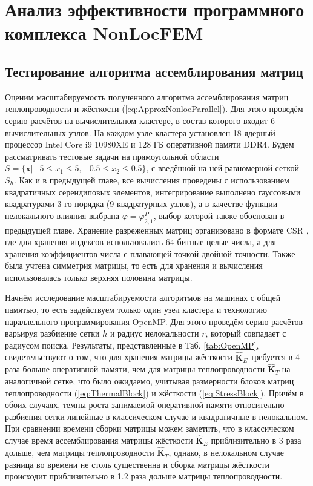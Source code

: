 \chapter{Анализ эффективности программного комплекса NonLocFEM}\label{ch:NonLocFEMAnalysis} 

\section{Тестирование алгоритма ассемблирования матриц}\label{sec:NumericalMethods/AssemblyTest}

Оценим масштабируемость полученного алгоритма ассемблирования матриц теплопроводности и жёсткости (\ref{eq:ApproxNonlocParallel}). Для этого проведём серию расчётов на вычислительном кластере, в состав которого входит 6 вычислительных узлов. На каждом узле кластера установлен 18-ядерный процессор Intel Core i9 10980XE и 128 ГБ оперативной памяти DDR4. Будем рассматривать тестовые задачи на прямоугольной области $S = \{ \boldsymbol{x} | -5 \leqslant x_1 \leqslant 5, -0.5 \leqslant x_2 \leqslant 0.5 \}$, с введённой на ней равномерной сеткой $S_h$. Как и в предыдущей главе, все вычисления проведены с использованием квадратичных серендиповых элементов, интегрирование выполнено гауссовыми квадратурами 3-го порядка (9 квадратурных узлов), а в качестве функции нелокального влияния выбрана $\varphi = \varphi_{2,1}^P$, выбор которой также обоснован в предыдущей главе. Хранение разреженных матриц организовано в формате CSR \cite{Pisanetzkiy}, где для хранения индексов использовались 64-битные целые числа, а для хранения коэффициентов числа с плавающей точкой двойной точности. Также была учтена симметрия матрицы, то есть для хранения и вычисления использовалась только верхняя половина \mbox{матрицы.}

Начнём исследование масштабируемости алгоритмов на машинах с общей памятью, то есть задействуем только один узел кластера и технологию параллельного программирования OpenMP. Для этого проведём серию расчётов варьируя разбиение сетки $h$ и радиус нелокальности $r$, который совпадает с радиусом поиска. Результаты, представленные в Таб. \ref{tab:OpenMP}, свидетельствуют о том, что для хранения матрицы жёсткости $\widehat{\textbf{K}}_E$ требуется в 4 раза больше оперативной памяти, чем для матрицы теплопроводности $\widehat{\textbf{K}}_T$ на аналогичной сетке, что было ожидаемо, учитывая размерности блоков матриц теплопроводности (\ref{eq:ThermalBlock}) и жёсткости (\ref{eq:StressBlock}). Причём в обоих случаях, темпы роста занимаемой оперативной памяти относительно разбиения сетки линейные в классическом случае и квадратичные в нелокальном. При сравнении времени сборки матрицы можем заметить, что в классическом случае время ассемблирования матрицы жёсткости $\widehat{\textbf{K}}_E$ приблизительно в 3 раза дольше, чем матрицы теплопроводности $\widehat{\textbf{K}}_T$, однако, в нелокальном случае разница во времени не столь существенна и сборка матрицы жёсткости происходит приблизительно в 1.2 раза дольше матрицы теплопроводности.

